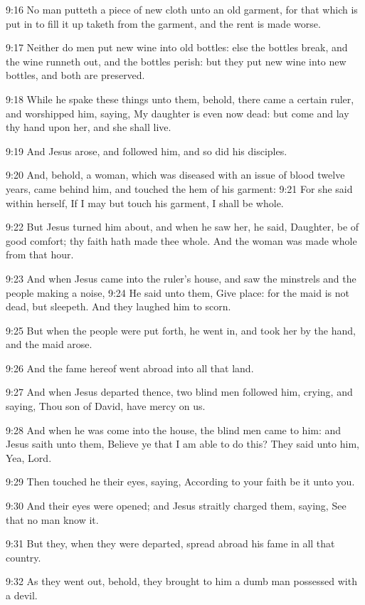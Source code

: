 9:16 No man putteth a piece of new cloth unto an old garment, for that which is put in to fill it up taketh from the garment, and the rent is made worse.

9:17 Neither do men put new wine into old bottles: else the bottles break, and the wine runneth out, and the bottles perish: but they put new wine into new bottles, and both are preserved.

9:18 While he spake these things unto them, behold, there came a certain ruler, and worshipped him, saying, My daughter is even now dead: but come and lay thy hand upon her, and she shall live.

9:19 And Jesus arose, and followed him, and so did his disciples.

9:20 And, behold, a woman, which was diseased with an issue of blood twelve years, came behind him, and touched the hem of his garment: 9:21 For she said within herself, If I may but touch his garment, I shall be whole.

9:22 But Jesus turned him about, and when he saw her, he said, Daughter, be of good comfort; thy faith hath made thee whole. And the woman was made whole from that hour.

9:23 And when Jesus came into the ruler's house, and saw the minstrels and the people making a noise, 9:24 He said unto them, Give place: for the maid is not dead, but sleepeth. And they laughed him to scorn.

9:25 But when the people were put forth, he went in, and took her by the hand, and the maid arose.

9:26 And the fame hereof went abroad into all that land.

9:27 And when Jesus departed thence, two blind men followed him, crying, and saying, Thou son of David, have mercy on us.

9:28 And when he was come into the house, the blind men came to him: and Jesus saith unto them, Believe ye that I am able to do this? They said unto him, Yea, Lord.

9:29 Then touched he their eyes, saying, According to your faith be it unto you.

9:30 And their eyes were opened; and Jesus straitly charged them, saying, See that no man know it.

9:31 But they, when they were departed, spread abroad his fame in all that country.

9:32 As they went out, behold, they brought to him a dumb man possessed with a devil.

